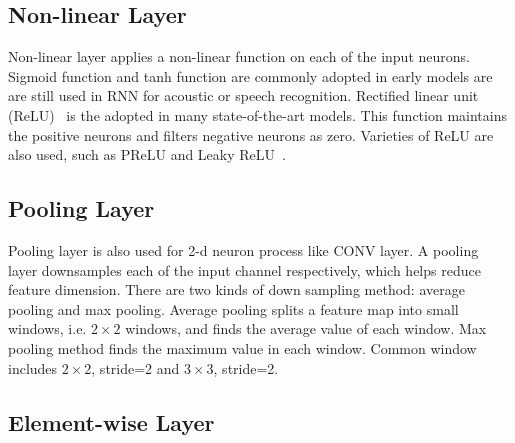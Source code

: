 \subsection{Non-linear Layer}
Non-linear layer applies a non-linear function on each of the input neurons. Sigmoid function and tanh function are commonly adopted in early models are are still used in RNN for acoustic or speech recognition. Rectified linear unit (ReLU)~\cite{krizhevsky2012imagenet} is the adopted in many state-of-the-art models. This function maintains the positive neurons and filters negative neurons as zero. Varieties of ReLU are also used, such as PReLU and Leaky ReLU~\cite{xu2015empirical}.

\subsection{Pooling Layer}
Pooling layer is also used for 2-d neuron process like CONV layer. A pooling layer downsamples each of the input channel respectively, which helps reduce feature dimension. There are two kinds of down sampling method: average pooling and max pooling. Average pooling splits a feature map into small windows, i.e. $2\times2$ windows, and finds the average value of each window. Max pooling method finds the maximum value in each window. Common window includes $2\times2$, stride=2 and $3\times3$, stride=2.

\subsection{Element-wise Layer}